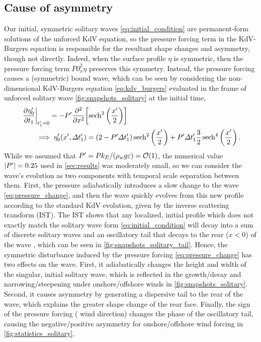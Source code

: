 \documentclass{jfm}
\renewcommand*{\epsilon}{\varepsilon}
\begin{document}
\subsection{\label{sec:physical_reason} Cause of asymmetry}
Our initial, symmetric solitary waves \cref{eq:initial_condition} are
permanent-form solutions of the unforced KdV equation, so the pressure
forcing term in the KdV-Burgers equation is responsible for the
resultant shape changes and asymmetry, though not directly.
Indeed, when the surface profile $\eta$ is symmetric, then the pressure
forcing term $P \partial_x^2 \eta$ preserves this symmetry.
Instead, the pressure forcing causes a (symmetric) bound wave, which can
be seen by considering the non-dimensional KdV-Burgers equation
\cref{eq:kdv_burgers} evaluated in the frame of unforced solitary wave
\cref{fig:snapshots_solitary} at the initial time,
\begin{equation}
  \begin{split}
  &\eval{\pdv{\eta'_0}{t_1}}_{t'_1=0} = -P' \pdv[2]{x} \bqty{
  \sech^2\pqty{\frac{x'}{2}}}
  \\
  &\qquad \implies \eta'_0(x', \Delta t'_1) =
  (2-P'\Delta t'_1) \sech^2\pqty{\frac{x'}{2}}
  +
  P' \Delta t'_1 \frac{3}{2}\sech^4\pqty{\frac{x'}{2}}
  \,.
  \end{split}
  \label{eq:pressure_change}
\end{equation}
While we assumed that $P' = Pk_E/(\rho_w g \epsilon) = \order{1}$, the
numerical value $\abs{P'} = 0.25$ used in \cref{sec:results} was
moderately small, so we can consider the wave's evolution as two
components with temporal scale separation between them.
First, the pressure adiabatically introduces a slow change to the wave
\cref{eq:pressure_change}, and then the wave quickly evolves from this
new profile according to the standard KdV evolution, given by the
inverse scattering transform (IST).
The IST shows that any localized, initial profile which does not exactly
match the solitary wave form \cref{eq:initial_condition} will decay into
a sum of discrete solitary waves and an oscillatory tail that decays to
the rear ($x<0$) of the wave \citep[\eg][]{mei2005nonlinear}, which can
be seen in \cref{fig:snapshots_solitary_tail}.
Hence, the symmetric disturbance induced by the pressure forcing
\cref{eq:pressure_change} has two effects on the wave.
First, it adiabatically changes the height and width of the singular,
initial solitary wave, which is reflected in the growth/decay and
narrowing/steepening under onshore/offshore winds in
\cref{fig:snapshots_solitary}.
Second, it causes asymmetry by generating a dispersive tail to the rear
of the wave, which explains the greater shape change of the rear face.
Finally, the sign of the pressure forcing (\ie{} wind direction) changes
the phase of the oscillatory tail, causing the negative/positive
asymmetry for onshore/offshore wind forcing in
\cref{fig:statistics_solitary}.
\end{document}
